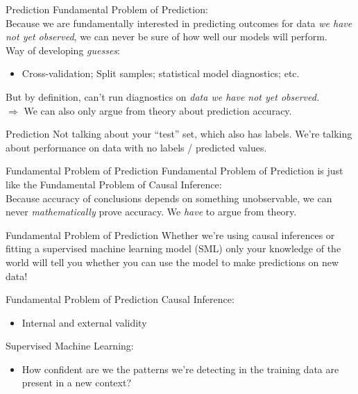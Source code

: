 \documentclass[11pt,handout]{beamer}
\begin{document}
\begin{frame}[c]{Prediction}
  \alert{Fundamental Problem of Prediction:} \\
  Because we are fundamentally interested in predicting outcomes for data \emph{we have not yet observed}, we can \alert{never} be sure of how well our models will perform. \\
  \pause Way of developing \emph{guesses}:
  \begin{itemize}
    \item Cross-validation; Split samples; statistical model diagnostics; etc.
  \end{itemize}
  \pause But by definition, can't run diagnostics on \emph{data we have not yet observed.} \\
  $\Rightarrow$ We can also only argue \alert{from theory} about prediction accuracy.
\end{frame}

\begin{frame}[c]{Prediction}
 \alert{Not} talking about your ``test'' set, which also has labels. We're talking about performance on data with no labels / predicted values.
\end{frame}

\begin{frame}[c]{Fundamental Problem of Prediction}
    \alert{Fundamental Problem of Prediction} is just like the \alert{Fundamental Problem of Causal Inference}: \\
    Because accuracy of conclusions depends on something unobservable, we can never \emph{mathematically} prove accuracy. We \emph{have} to argue from theory.
\end{frame}

\begin{frame}[c]{Fundamental Problem of Prediction}
Whether we're using causal inferences or fitting a supervised machine learning model (SML) only your knowledge of the world will tell you whether you can use the model to make predictions on new data!

\end{frame}

\begin{frame}[c]{Fundamental Problem of Prediction}
Causal Inference:
\begin{itemize}
  \item Internal and external validity
\end{itemize}
Supervised Machine Learning:
\begin{itemize}
  \item How confident are we the patterns we're detecting in the training data are present in a new context?
\end{itemize}
\end{frame}
\end{document}
